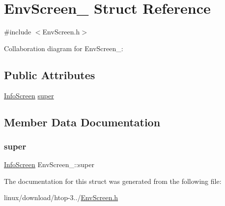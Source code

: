 \hypertarget{structEnvScreen__}{}\section{Env\+Screen\+\_\+ Struct Reference}
\label{structEnvScreen__}


{\ttfamily \#include $<$Env\+Screen.\+h$>$}



Collaboration diagram for Env\+Screen\+\_\+\+:
\subsection*{Public Attributes}
\begin{DoxyCompactItemize}
\item 
\hyperlink{InfoScreen_8h_a97139d799c65bdbb53b127e2717369c8}{Info\+Screen} \hyperlink{structEnvScreen___ade1e0fc94d0267e42beca4c839d255b6}{super}
\end{DoxyCompactItemize}


\subsection{Member Data Documentation}
\mbox{\label{structEnvScreen___ade1e0fc94d0267e42beca4c839d255b6}} 
\subsubsection{\texorpdfstring{super}{super}}
{\footnotesize\ttfamily \hyperlink{InfoScreen_8h_a97139d799c65bdbb53b127e2717369c8}{Info\+Screen} Env\+Screen\+\_\+\+::super}



The documentation for this struct was generated from the following file\+:\begin{DoxyCompactItemize}
\item 
linux/download/htop-\/3../\hyperlink{EnvScreen_8h}{Env\+Screen.\+h}\end{DoxyCompactItemize}
